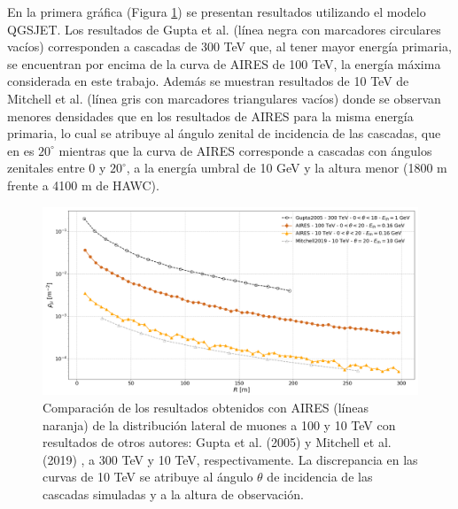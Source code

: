 \documentclass[12pt,letterpaper]{report}
\begin{document}
En la primera gr\'afica (Figura \ref{fig:comparacion_otros}) se presentan resultados utilizando el modelo QGSJET. Los resultados de Gupta et al. (l\'inea negra con marcadores circulares vac\'ios) corresponden a cascadas de 300 TeV \cite{Gupta2005} que, al tener mayor energ\'ia primaria, se encuentran por encima de la curva de AIRES de 100 TeV, la energ\'ia m\'axima considerada en este trabajo. Adem\'as se muestran resultados de 10 TeV  de Mitchell et al. \cite{Mitchell2019} (l\'inea gris con marcadores triangulares vac\'ios) donde se observan menores densidades que en los resultados de AIRES para la misma energ\'ia primaria, lo cual se atribuye al \'angulo zenital de incidencia de las cascadas, que en \cite{Mitchell2019} es $20^{\circ}$ mientras que la curva de AIRES corresponde a cascadas con \'angulos zenitales entre 0 y $20^{\circ}$, a la energ\'ia umbral de 10 GeV y la altura menor (1800 m frente a 4100 m de HAWC).
	\begin{figure}[] 
	\includegraphics[width=\textwidth]{Figuras/comparacion_otros}
	\caption{Comparaci\'on de los resultados obtenidos con AIRES (l\'ineas naranja) de la distribuci\'on lateral de muones a 100 y 10 TeV con resultados de otros autores: Gupta et al. (2005) \cite{Gupta2005} y Mitchell et al. (2019) \cite{Mitchell2019}, a 300 TeV y 10 TeV, respectivamente. La discrepancia en las curvas de 10 TeV se atribuye al \'angulo $\theta$ de incidencia de las cascadas simuladas y a la altura de observaci\'on.}
	\label{fig:comparacion_otros}
	\end{figure}	
	
\end{document}
